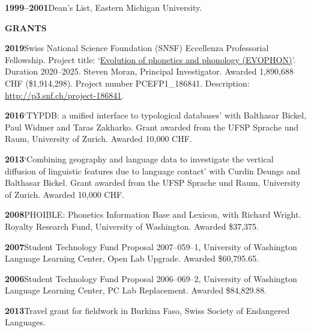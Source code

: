 \documentclass[11pt]{article}
\newcommand{\hangpara}{
 \setlength{\parindent}{0in} %
 \hangindent=0.42in %
}
\begin{document}
\vskip 6pt
\hangpara
{\bf 1999--2001}\hspace{1ex}Dean's List, Eastern Michigan University.


\vskip 20pt
\begin{flushleft}
{\bf GRANTS}
\end{flushleft}


\hangpara
{\bf 2019}\hspace{1ex}Swiss National Science Foundation (SNSF) Eccellenza Professorial Fellowship. Project title: `\href{http://p3.snf.ch/project-186841}{Evolution of phonetics and phonology (EVOPHON)}'. Duration 2020--2025. Steven Moran, Principal Investigator. Awarded 1,890,688 CHF (\$1,914,298). Project number PCEFP1\_186841. Description: \url{http://p3.snf.ch/project-186841}.

\vskip 6pt
\hangpara
{\bf 2016}\hspace{1ex}`TYPDB: a unified interface to typological databases' with Balthasar Bickel, Paul Widmer and Taras Zakharko. Grant awarded from the UFSP Sprache und Raum, University of Zurich. Awarded 10,000 CHF.

\vskip 6pt
\hangpara
{\bf 2013}\hspace{1ex}`Combining geography and language data to investigate the vertical diffusion of linguistic features due to language contact' with Curdin Deungs and Balthasar Bickel. Grant awarded from the UFSP Sprache und Raum, University of Zurich. Awarded 10,000 CHF.

\vskip 6pt
\hangpara
{\bf 2008}\hspace{1ex}PHOIBLE: Phonetics Information Base and Lexicon, with Richard Wright. Royalty Research Fund, University of Washington. Awarded \$37,375.

\vskip 6pt
\hangpara
{\bf 2007}\hspace{1ex}Student Technology Fund Proposal 2007--059--1, University of Washington Language Learning Center, Open Lab Upgrade. Awarded \$60,795.65.

\vskip 6pt
\hangpara
{\bf 2006}\hspace{1ex}Student Technology Fund Proposal 2006--069--2, University of Washington Language Learning Center, PC Lab Replacement. Awarded \$84,829.88.

\vskip 6pt
\hangpara
{\bf 2013}\hspace{1ex}Travel grant for fieldwork in Burkina Faso, Swiss Society of Endangered Languages.
\end{document}
